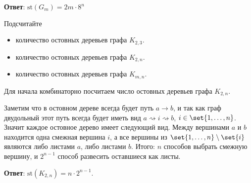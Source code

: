 \documentclass[a4paper,12pt,twoside]{article}
\begin{document}
\begin{solution}{}
    \noindent \textbf{Ответ}: \(\mathrm{st}(G_m) = 2m \cdot 8^n\)
\end{solution}

\begin{?} Подсчитайте
    \begin{itemize}[noitemsep, topsep=0pt, parsep=0pt]
        \item количество остовных деревьев графа $K_{2,3}$.
        \item количество остовных деревьев графа $K_{2,n}$.
        \item количество остовных деревьев графа $K_{m,n}$.
    \end{itemize}
\end{?}
\begin{solution}{}
Для начала комбинаторно посчитаем число остовных деревьев графа $K_{2,n}$. 
\begin{center}
\end{center}
Заметим что в остовном дереве всегда будет путь $a \to b$, и так как граф двудольный этот путь всегда будет иметь вид $a \rightsquigarrow i \rightsquigarrow b$, $i \in \set{1, \ldots, n}$. Значит каждое остовное дерево имеет следующий вид. Между вершинами $a$ и $b$ находится одна смежная вершина $i$, а все вершины из $\set{1, \ldots, n} \setminus \set{i}$ являются либо листами $a$, либо листами $b$. Итого: $n$ способов выбрать смежную вершину, и $2^{n-1}$ способ развесить оставшиеся как листы.

\begin{center}
\end{center}

\noindent \textbf{Ответ}: \(\mathrm{st}(K_{2, n}) = n \cdot 2^{n -1}\).



\end{solution}
\end{document}
